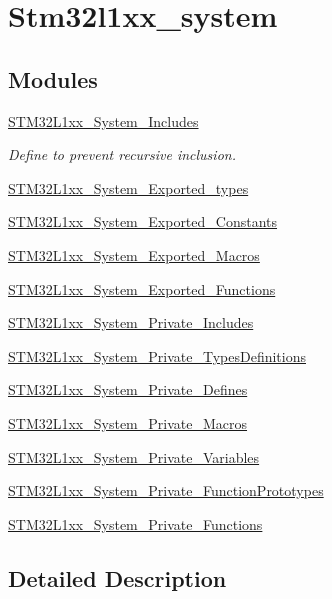 \hypertarget{group__stm32l1xx__system}{\section{Stm32l1xx\-\_\-system}
\label{group__stm32l1xx__system}
}
\subsection*{Modules}
\begin{DoxyCompactItemize}
\item 
\hyperlink{group___s_t_m32_l1xx___system___includes}{S\-T\-M32\-L1xx\-\_\-\-System\-\_\-\-Includes}
\begin{DoxyCompactList}\small\item\em Define to prevent recursive inclusion. \end{DoxyCompactList}\item 
\hyperlink{group___s_t_m32_l1xx___system___exported__types}{S\-T\-M32\-L1xx\-\_\-\-System\-\_\-\-Exported\-\_\-types}
\item 
\hyperlink{group___s_t_m32_l1xx___system___exported___constants}{S\-T\-M32\-L1xx\-\_\-\-System\-\_\-\-Exported\-\_\-\-Constants}
\item 
\hyperlink{group___s_t_m32_l1xx___system___exported___macros}{S\-T\-M32\-L1xx\-\_\-\-System\-\_\-\-Exported\-\_\-\-Macros}
\item 
\hyperlink{group___s_t_m32_l1xx___system___exported___functions}{S\-T\-M32\-L1xx\-\_\-\-System\-\_\-\-Exported\-\_\-\-Functions}
\item 
\hyperlink{group___s_t_m32_l1xx___system___private___includes}{S\-T\-M32\-L1xx\-\_\-\-System\-\_\-\-Private\-\_\-\-Includes}
\item 
\hyperlink{group___s_t_m32_l1xx___system___private___types_definitions}{S\-T\-M32\-L1xx\-\_\-\-System\-\_\-\-Private\-\_\-\-Types\-Definitions}
\item 
\hyperlink{group___s_t_m32_l1xx___system___private___defines}{S\-T\-M32\-L1xx\-\_\-\-System\-\_\-\-Private\-\_\-\-Defines}
\item 
\hyperlink{group___s_t_m32_l1xx___system___private___macros}{S\-T\-M32\-L1xx\-\_\-\-System\-\_\-\-Private\-\_\-\-Macros}
\item 
\hyperlink{group___s_t_m32_l1xx___system___private___variables}{S\-T\-M32\-L1xx\-\_\-\-System\-\_\-\-Private\-\_\-\-Variables}
\item 
\hyperlink{group___s_t_m32_l1xx___system___private___function_prototypes}{S\-T\-M32\-L1xx\-\_\-\-System\-\_\-\-Private\-\_\-\-Function\-Prototypes}
\item 
\hyperlink{group___s_t_m32_l1xx___system___private___functions}{S\-T\-M32\-L1xx\-\_\-\-System\-\_\-\-Private\-\_\-\-Functions}
\end{DoxyCompactItemize}


\subsection{Detailed Description}
